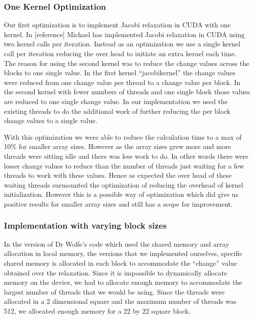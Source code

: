 \documentclass[10pt]{article}
\begin{document}
\begin{multicols}{2}
  \subsubsection{One Kernel Optimization}
  Our first optimization is to implement Jacobi relaxation in CUDA with one kernel.
  In [reference] Michael has implemented Jacobi relaxation in CUDA using two kernel calls per iteration.
  Instead as an optimization we use a single kernel call per iteration reducing the over head to initiate an extra kernel each time.
  The reason for using the second kernel was to reduce the change values across the blocks to one single value.
  In the first kernel ``jacobikernel'' the change values were reduced from one change value per thread to a change value per block.
  In the second kernel with fewer numbers of threads and one single block those values are reduced to one single change value.
  In our implementation we used the existing threads to do the additional work of further reducing the per block change values to a single value.

  With this optimization we were able to reduce the calculation time to a max of 10\% for smaller array sizes.
  However as the array sizes grew more and more threads were sitting idle and there was less work to do.
  In other words there were lesser change values to reduce than the number of threads just waiting for a few threads to work with these values.
  Hence as expected the over head of these waiting threads surmounted the optimization of reducing the overhead of kernel initialization.
  However this is a possible way of optimization which did give us positive results for smaller array sizes and still has a scope for improvement.
  
  \subsubsection{Implementation with varying block sizes}
  In the version of Dr Wolfe's code which used the shared memory and array allocation in local memory, the versions that we implemented ourselves, specific shared memory is allocated in each block to accommodate the “change” value obtained over the relaxation.
  Since it is impossible to dynamically allocate memory on the device, we had to allocate enough memory to accommodate the largest number of threads that we would be using.
  Since the threads were allocated in a 2 dimensional square and the maximum number of threads was 512, we allocated enough memory for a 22 by 22 square block.


\end{multicols}
\end{document}
